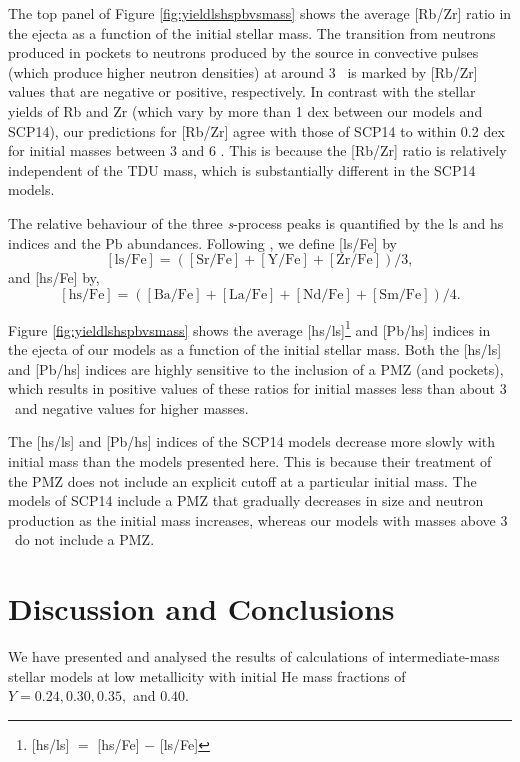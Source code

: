 The top panel of Figure \ref{fig:yieldlshspbvsmass} shows the average [Rb/Zr] ratio in the ejecta as a function of the initial stellar mass. The transition from neutrons produced in  pockets to neutrons produced by the  source in convective pulses (which produce higher neutron densities) at around 3 \Msun\ is marked by [Rb/Zr] values that are negative or positive, respectively. In contrast with the stellar yields of Rb and Zr (which vary by more than 1 dex between our models and SCP14), our predictions for [Rb/Zr] agree with those of SCP14 to within 0.2 dex for initial masses between 3 and 6 \Msun. This is because the [Rb/Zr] ratio is relatively independent of the TDU mass, which is substantially different in the SCP14 models.

The relative behaviour of the three \textit{s}-process peaks is quantified by the ls and hs indices and the Pb abundances. Following \citet{Cristallo:2011fz}, we define [ls/Fe] by
\begin{equation}
\mathrm{[ls/Fe] = ([Sr/Fe]+[Y/Fe]+[Zr/Fe])/3},
\end{equation}
and [hs/Fe] by,
\begin{equation}
\mathrm{[hs/Fe] = ([Ba/Fe]+[La/Fe]+[Nd/Fe]+[Sm/Fe])/4}.
\end{equation}

Figure \ref{fig:yieldlshspbvsmass} shows the average [hs/ls]\footnote{[hs/ls] $=$ [hs/Fe] $-$ [ls/Fe]} and [Pb/hs] indices in the ejecta of our models as a function of the initial stellar mass. Both the [hs/ls] and [Pb/hs] indices are highly sensitive to the inclusion of a PMZ (and  pockets), which results in positive values of these ratios for initial masses less than about 3 \Msun\ and negative values for higher masses.

The [hs/ls] and [Pb/hs] indices of the SCP14 models decrease more slowly with initial mass than the models presented here. This is because their treatment of the PMZ does not include an explicit cutoff at a particular initial mass. The models of SCP14 include a PMZ that gradually decreases in size and neutron production as the initial mass increases, whereas our models with masses above 3 \Msun\ do not include a PMZ.

\section{Discussion and Conclusions}\label{sec:discussion}
We have presented and analysed the results of calculations of intermediate-mass stellar models at low metallicity with initial He mass fractions of $Y=0.24, 0.30, 0.35,$ and $0.40$.

